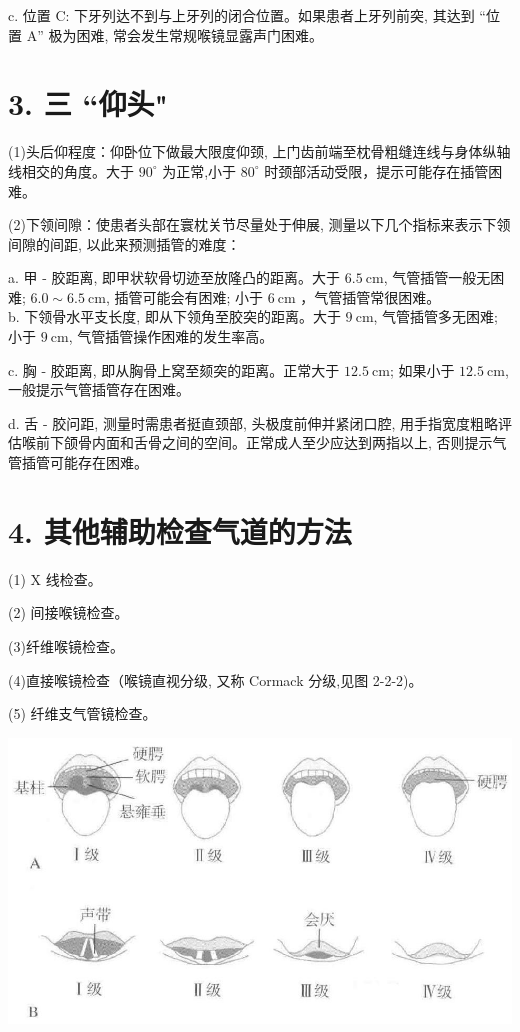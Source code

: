 \documentclass[10pt]{article}
\begin{document}
c. 位置 C: 下牙列达不到与上牙列的闭合位置。如果患者上牙列前突, 其达到 “位置 A” 极为困难, 常会发生常规喉镜显露声门困难。

\section*{3. 三 “仰头"}
(1)头后仰程度：仰卧位下做最大限度仰颈, 上门齿前端至枕骨粗缝连线与身体纵轴线相交的角度。大于 $90^{\circ}$ 为正常,小于 $80^{\circ}$ 时颈部活动受限，提示可能存在插管困难。

(2)下领间隙：使患者头部在寰枕关节尽量处于伸展, 测量以下几个指标来表示下领间隙的间距, 以此来预测插管的难度：

a. 甲 - 㬵距离, 即甲状软骨切迹至放隆凸的距离。大于 $6.5 \mathrm{~cm}$, 气管插管一般无困难; $6.0 \sim 6.5 \mathrm{~cm}$, 插管可能会有困难; 小于 $6 \mathrm{~cm}$ ，气管插管常很困难。\\
b. 下领骨水平支长度, 即从下领角至㬵突的距离。大于 $9 \mathrm{~cm}$, 气管插管多无困难; 小于 $9 \mathrm{~cm}$, 气管插管操作困难的发生率高。

c. 胸 - 㬵距离, 即从胸骨上窝至颏突的距离。正常大于 $12.5 \mathrm{~cm}$; 如果小于 $12.5 \mathrm{~cm}$, 一般提示气管插管存在困难。

d. 舌 - 㬵问距, 测量时需患者挺直颈部, 头极度前伸并紧闭口腔, 用手指宽度粗略评估喉前下颌骨内面和舌骨之间的空间。正常成人至少应达到两指以上, 否则提示气管插管可能存在困难。

\section*{4. 其他辅助检查气道的方法}
(1) $\mathrm{X}$ 线检查。

(2) 间接喉镜检查。

(3)纤维喉镜检查。

(4)直接喉镜检查（喉镜直视分级, 又称 Cormack 分级,见图 2-2-2)。

(5) 纤维支气管镜检查。

\begin{center}
\includegraphics[max width=\textwidth]{2024_07_05_645bb794a4d4f32ee0c8g-048}
\end{center}
\end{document}
